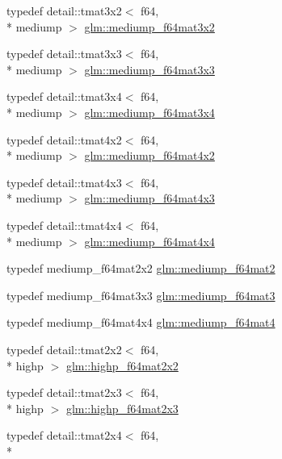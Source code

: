 \begin{DoxyCompactItemize}
\item 
typedef detail\-::tmat3x2$<$ f64, \\*
mediump $>$ \hyperlink{group__gtc__type__precision_gad6408472435fce994a3bb9d14d321ddd}{glm\-::mediump\-\_\-f64mat3x2}
\item 
typedef detail\-::tmat3x3$<$ f64, \\*
mediump $>$ \hyperlink{group__gtc__type__precision_ga871b69a221dae7461aa746e6e6d372fc}{glm\-::mediump\-\_\-f64mat3x3}
\item 
typedef detail\-::tmat3x4$<$ f64, \\*
mediump $>$ \hyperlink{group__gtc__type__precision_gac3b0ca6d79631a2480cee8897dcd79ec}{glm\-::mediump\-\_\-f64mat3x4}
\item 
typedef detail\-::tmat4x2$<$ f64, \\*
mediump $>$ \hyperlink{group__gtc__type__precision_ga4a7a2b6889f08c9209a4f994fd87cc4e}{glm\-::mediump\-\_\-f64mat4x2}
\item 
typedef detail\-::tmat4x3$<$ f64, \\*
mediump $>$ \hyperlink{group__gtc__type__precision_ga4a920abfb082b0ffd8d89614cb787021}{glm\-::mediump\-\_\-f64mat4x3}
\item 
typedef detail\-::tmat4x4$<$ f64, \\*
mediump $>$ \hyperlink{group__gtc__type__precision_ga941e42a0b337b5c8ad9c324aaa6b2ad5}{glm\-::mediump\-\_\-f64mat4x4}
\item 
typedef mediump\-\_\-f64mat2x2 \hyperlink{group__gtc__type__precision_gaa7eac0340d2aaf670ec4dfbd1826fd35}{glm\-::mediump\-\_\-f64mat2}
\item 
typedef mediump\-\_\-f64mat3x3 \hyperlink{group__gtc__type__precision_gae38a4a0b57e25d9cbb153dcaab9432ec}{glm\-::mediump\-\_\-f64mat3}
\item 
typedef mediump\-\_\-f64mat4x4 \hyperlink{group__gtc__type__precision_ga2763f655bfe2141a014e66d26a9d2f18}{glm\-::mediump\-\_\-f64mat4}
\item 
typedef detail\-::tmat2x2$<$ f64, \\*
highp $>$ \hyperlink{group__gtc__type__precision_ga4babca568fc88f185620c02e4fdac0d8}{glm\-::highp\-\_\-f64mat2x2}
\item 
typedef detail\-::tmat2x3$<$ f64, \\*
highp $>$ \hyperlink{group__gtc__type__precision_gafb5b42b29b3bd7f1605483223fa35312}{glm\-::highp\-\_\-f64mat2x3}
\item 
typedef detail\-::tmat2x4$<$ f64, \\*

\end{DoxyCompactItemize}

